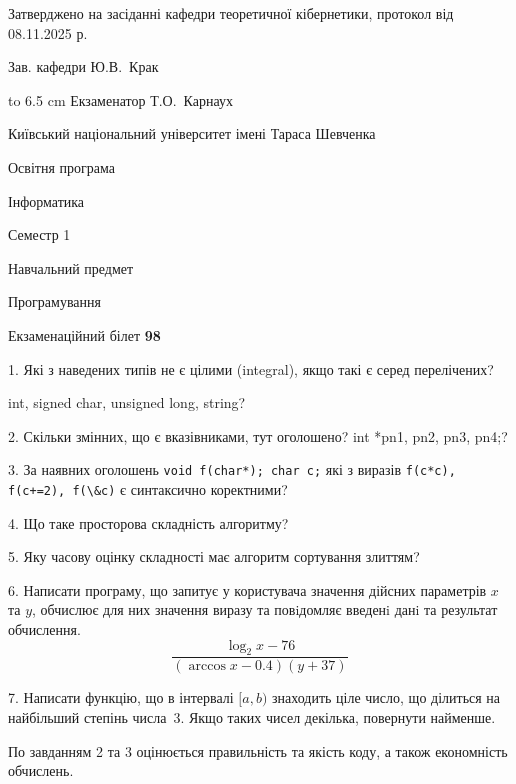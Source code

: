 \documentclass[12pt, ukrainian]{article}
\def\code#1{\Verb!#1!}
\begin{document}
{\smallskip\smallskip \begin {scriptsize} Затверджено на засіданні кафедри теоретичної кібернетики, протокол   від   08.11.2025 р.\par\smallskip\smallskip\smallskip\smallskip
{\parbox {6.5 cm} {Зав. кафедри \dotfill Ю.В.~Крак}}\hspace {0.7cm} {\hbox to 6.5 cm { Екзаменатор \dotfill Т.О.~Карнаух}} \end{scriptsize}}
\vspace{0.9cm}
{{\begin {scriptsize}\par
{ \center  Київський національний університет імені Тараса Шевченка \par}
{\parbox {5 cm}{Освітня програма \hfill}{\parbox {7 cm}{Інформатика\hfill}}\parbox {6 cm}{\hfill Семестр 1}}\par
{\parbox {5 cm} {Навчальний предмет \hfill}\parbox {7 cm}{Програмування \hfill}\parbox {6cm}{\hfill}\par}\vspace{-15pt} \end{scriptsize}}{\center Екзаменаційний білет \No \textbf { 98 }\par}}
{%
1. Які з наведених типів не є цілими (integral), якщо такі є серед перелічених?

int, signed char, unsigned long, string?
\par
\vspace{2mm}
2. Скільки змінних, що є вказівниками, тут оголошено?
int *pn1, pn2, pn3, pn4;?
\par
\vspace{2mm}
3. За наявних оголошень \code{void f(char*); char c;} які з виразів \code{f(c*c), f(c+=2), f(\&c)} є синтаксично коректними?
\par
\vspace{2mm}
4. Що таке просторова складність алгоритму?
\par
\vspace{2mm}
5. Яку часову оцінку складності має алгоритм сортування злиттям?
\par
\vspace{2mm}
6. Написати програму, що запитує у користувача значення дійсних параметрів $x$ та $y$, обчислює для них значення виразу та повiдомляє введенi данi та результат обчислення.
$$\frac{\log_{2} x - 76}{(\arccos x - 0.4) (y + 37)}$$ 

\par
7. Написати функцію, що в інтервалі $[a, b)$ знаходить ціле число, що ділиться на найбільший степінь числа 3. Якщо таких чисел декілька, повернути найменше.

По завданням 2 та 3 оцінюється правильність та якість коду, а також економність обчислень.

}
\end{document}
